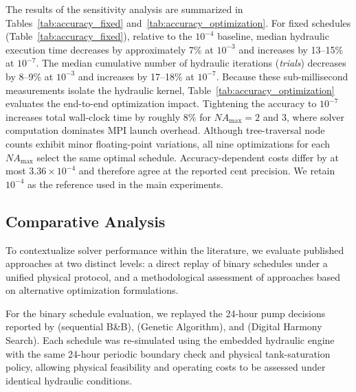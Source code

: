 \documentclass[Journal,letterpaper,InsideFigs]{ascelike-new}
\begin{document}
\begin{table}[htbp]
	\centering
	\caption{Hydraulic sensitivity of fixed schedules across convergence tolerances.}
	\label{tab:accuracy_fixed}
	\small
	
\end{table}

\begin{table}[htbp]
	\centering
	\caption{End-to-end optimization sensitivity across convergence tolerances.}
	\label{tab:accuracy_optimization}
	\small
	
\end{table}

The results of the sensitivity analysis are summarized in Tables~\ref{tab:accuracy_fixed} and~\ref{tab:accuracy_optimization}. For fixed schedules (Table~\ref{tab:accuracy_fixed}), relative to the $10^{-4}$ baseline, median hydraulic execution time decreases by approximately 7\% at $10^{-3}$ and increases by 13--15\% at $10^{-7}$. The median cumulative number of hydraulic iterations (\emph{trials}) decreases by 8--9\% at $10^{-3}$ and increases by 17--18\% at $10^{-7}$. Because these sub-millisecond measurements isolate the hydraulic kernel, Table~\ref{tab:accuracy_optimization} evaluates the end-to-end optimization impact. Tightening the accuracy to $10^{-7}$ increases total wall-clock time by roughly 8\% for $NA_{\max}=2$ and $3$, where solver computation dominates MPI launch overhead. Although tree-traversal node counts exhibit minor floating-point variations, all nine optimizations for each $NA_{\max}$ select the same optimal schedule. Accuracy-dependent costs differ by at most $3.36\times10^{-4}$ and therefore agree at the reported cent precision. We retain $10^{-4}$ as the reference used in the main experiments.

\subsection{Comparative Analysis}

To contextualize solver performance within the literature, we evaluate published approaches at two distinct levels: a direct replay of binary schedules under a unified physical protocol, and a methodological assessment of approaches based on alternative optimization formulations.

For the binary schedule evaluation, we replayed the 24-hour pump decisions reported by  (sequential B\&B),  (Genetic Algorithm), and  (Digital Harmony Search). Each schedule was re-simulated using the embedded hydraulic engine with the same 24-hour periodic boundary check and physical tank-saturation policy, allowing physical feasibility and operating costs to be assessed under identical hydraulic conditions.
\end{document}
